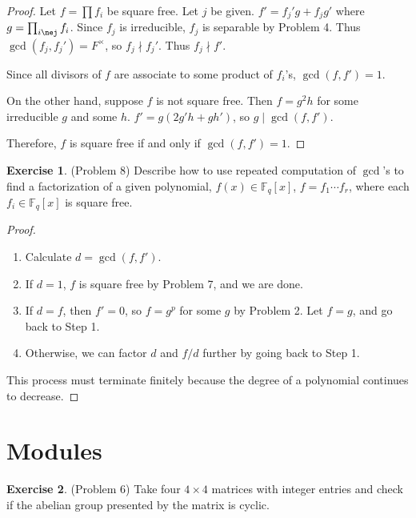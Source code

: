 \documentclass[12pt, psamsfonts]{amsart}
\theoremstyle{definition}
\newtheorem*{exer}{Exercise}
\theoremstyle{remark}
\numberwithin{equation}{section}
\begin{document}
\begin{proof}
  Let $f = \prod f_i$ be square free.
  Let $j$ be given.
  $f' = f_j'g + f_jg'$ where $g = \prod_{i\nej} f_i$.
  Since $f_j$ is irreducible, $f_j$ is separable by Problem 4.
  Thus $\gcd(f_j, f_j') = F^{\times}$, so $f_j \nmid f_j'$.
  Thus $f_j \nmid f'$.

  Since all divisors of $f$ are associate to some product of $f_i$'s, $\gcd(f, f') = 1$.

  On the other hand, suppose $f$ is not square free.
  Then $f = g^2h$ for some irreducible $g$ and some $h$.
  $f' = g(2g'h + gh')$, so $g \mid \gcd(f, f')$.

  Therefore, $f$ is square free if and only if $\gcd(f, f') = 1$.
\end{proof}

\begin{exer}{(Problem 8)}
  Describe how to use repeated computation of $\gcd$'s to find a factorization of a given polynomial, $f(x) \in \mathbb{F}_q[x]$, $f = f_1 \cdots f_r$, where each $f_i \in \mathbb{F}_q[x]$ is square free.
\end{exer}

\begin{proof}
  $ $
  \begin{enumerate}
    \item 
      Calculate $d = \gcd(f, f')$.
    \item
      If $d = 1$, $f$ is square free by Problem 7, and we are done.
    \item
      If $d = f$, then $f' = 0$, so $f = g^p$ for some $g$ by Problem 2.
      Let $f = g$, and go back to Step 1.
    \item
      Otherwise, we can factor $d$ and $f / d$ further by going back to Step 1.
  \end{enumerate}
  This process must terminate finitely because the degree of a polynomial continues to decrease.
\end{proof}

\section{Modules}

\begin{exer}{(Problem 6)}
  Take four $4 \times 4$ matrices with integer entries and check if the abelian group presented by the matrix is cyclic.
\end{exer}
\end{document}
